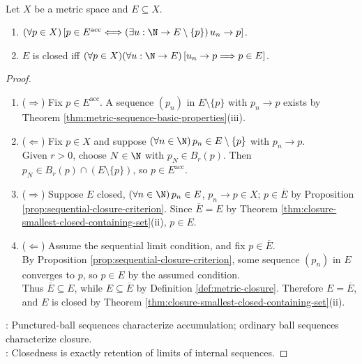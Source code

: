 \begin{theorem} \label{thm:closed-sets-and-limit-points-via-sequences} \\
Let $X$ be a metric space and $E\subseteq X$.
\begin{enumerate}[label=(\roman*)]
\setlength{\itemsep}{0pt}
\item $(\forall p\in X)\,[p\in E^{\operatorname{acc}}\Longleftrightarrow(\exists u:\N\to E\setminus\{p\})\,u_n\to p]$.
\item $E$ is closed iff $(\forall p\in X)(\forall u:\N\to E)\,[u_n\to p\Longrightarrow p\in E]$.
\end{enumerate}
\begin{proof}
\begin{enumerate}[label=(\roman*)]
\setlength{\itemsep}{0pt}
\item[$(i)$] ($\Rightarrow$) Fix $p\in E^{\operatorname{acc}}$. A sequence $(p_n)$ in $E\setminus\{p\}$ with $p_n\to p$ exists by Theorem \ref{thm:metric-sequence-basic-properties}(iii).
\item[$(i)$] ($\Leftarrow$) Fix $p\in X$ and suppose $(\forall n\in\N)\,p_n\in E\setminus\{p\}$ with $p_n\to p$.\\
Given $r>0$, choose $N\in\N$ with $p_N\in B_r(p)$. Then $p_N\in B_r(p)\cap(E\setminus\{p\})$, so $p\in E^{\operatorname{acc}}$.
\item[$(ii)$] ($\Rightarrow$) Suppose $E$ closed, $(\forall n\in\N)\,p_n\in E$, $p_n\to p\in X$; $p\in\overline{E}$ by Proposition \ref{prop:sequential-closure-criterion}. Since $\overline{E}=E$ by Theorem \ref{thm:closure-smallest-closed-containing-set}(ii), $p\in E$.
\item[$(ii)$] ($\Leftarrow$) Assume the sequential limit condition, and fix $p\in\overline{E}$.\\
By Proposition \ref{prop:sequential-closure-criterion}, some sequence $(p_n)$ in $E$ converges to $p$, so $p\in E$ by the assumed condition.\\
Thus $\overline{E}\subseteq E$, while $E\subseteq\overline{E}$ by Definition \ref{def:metric-closure}. Therefore $E=\overline{E}$, and $E$ is closed by Theorem \ref{thm:closure-smallest-closed-containing-set}(ii).
\end{enumerate}
: Punctured-ball sequences characterize accumulation; ordinary ball sequences characterize closure.\\
: Closedness is exactly retention of limits of internal sequences.
\end{proof}
\end{theorem}

